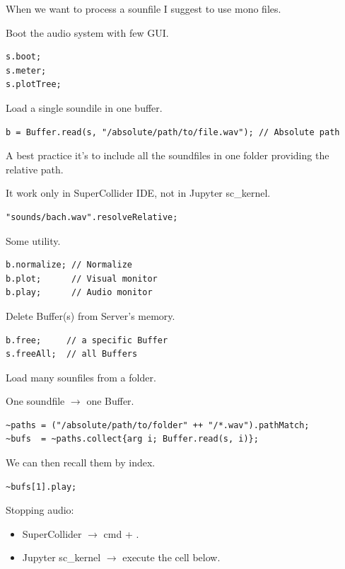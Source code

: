 When we want to process a sounfile I suggest to use mono files.

Boot the audio system with few GUI.

\begin{lstlisting}[frame=single] 
s.boot;
s.meter;
s.plotTree;
\end{lstlisting}

Load a single soundile in one buffer.

\begin{lstlisting}[frame=single] 
b = Buffer.read(s, "/absolute/path/to/file.wav"); // Absolute path
\end{lstlisting}

A best practice it's to include all the soundfiles in one folder providing the relative path.

It work only in SuperCollider IDE, not in Jupyter sc\_kernel.

\begin{lstlisting}[frame=single] 
"sounds/bach.wav".resolveRelative;
\end{lstlisting}

Some utility.

\begin{lstlisting}[frame=single] 
b.normalize; // Normalize
b.plot;      // Visual monitor
b.play;      // Audio monitor
\end{lstlisting}

Delete Buffer(s) from Server's memory.

\begin{lstlisting}[frame=single] 
b.free;     // a specific Buffer
s.freeAll;  // all Buffers
\end{lstlisting}

Load many sounfiles from a folder.

One soundfile \(\rightarrow\) one Buffer.

\begin{lstlisting}[frame=single] 
~paths = ("/absolute/path/to/folder" ++ "/*.wav").pathMatch; 
~bufs  = ~paths.collect{arg i; Buffer.read(s, i)};
\end{lstlisting}

We can then recall them by index.

\begin{lstlisting}[frame=single] 
~bufs[1].play; 
\end{lstlisting}

Stopping audio:

\begin{itemize}
\tightlist
\item SuperCollider \(\rightarrow\) cmd + .
\item Jupyter sc\_kernel \(\rightarrow\) execute the cell below.
\end{itemize}

